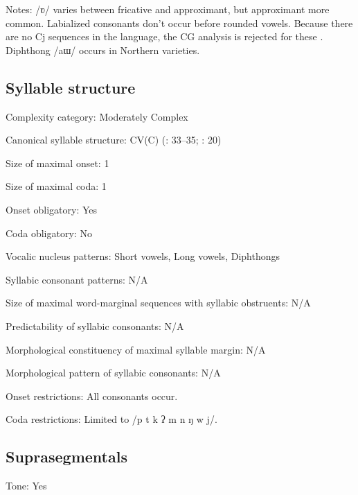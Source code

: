 {\begin{appendixdesc}
\item[Notes:] /ʋ/ varies between fricative and approximant, but approximant more common. Labialized consonants don’t occur before rounded vowels. Because there are no Cj sequences in the language, the CG analysis is rejected for these \citep[138]{Erickson2001}. Diphthong /aɯ/ occurs in Northern varieties.
\end{appendixdesc}
\subsection*{Syllable structure}
\begin{appendixdesc}

\item[Complexity category:] Moderately Complex

\item[Canonical syllable structure:] CV(C) (\citealt{Enfield2007}: 33--35; \citealt{MorevEtAl1979}: 20)

\item[Size of maximal onset:] 1

\item[Size of maximal coda:] 1

\item[Onset obligatory:] Yes

\item[Coda obligatory:] No

\item[Vocalic nucleus patterns:] Short vowels, Long vowels, Diphthongs

\item[Syllabic consonant patterns:] N/A

\item[Size of maximal word-marginal sequences with syllabic obstruents:] N/A

\item[Predictability of syllabic consonants:] N/A

\item[Morphological constituency of maximal syllable margin:] N/A

\item[Morphological pattern of syllabic consonants:] N/A

\item[Onset restrictions:] All consonants occur. 

\item[Coda restrictions:] Limited to /p t k ʔ m n ŋ w j/.
\end{appendixdesc}
\subsection*{Suprasegmentals}
\begin{appendixdesc}
\item[Tone:] Yes


\end{appendixdesc}}
